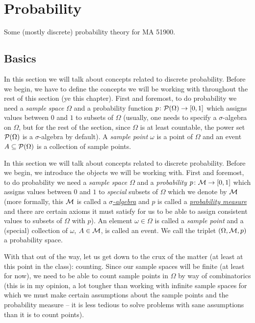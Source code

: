 \chapter{Probability}
Some (mostly discrete) probability theory for MA 51900.

\section{Basics}
In this section we will talk about concepts related to discrete
probability. Before we begin, we have to define the concepts we will be
working with throughout the rest of this section (ye this chapter). First
and foremost, to do probability we need a \emph{sample space \(\Omega\)}
and a probability function \(p\colon\mathcal{P}(\Omega)\to[0,1]\) which assigns
values between \(0\) and \(1\) to subsets of \(\Omega\) (usually, one needs
to specify a \(\sigma\)-algebra on \(\Omega\), but for the rest of the
section, since \(\Omega\) is at least countable, the power set
\(\mathcal{P}(\Omega)\) is a \(\sigma\)-algebra by default). A \emph{sample
  point} \(\omega\) is a point of \(\Omega\) and an event
\(A\subseteq\mathcal{P}(\Omega)\) is a collection of sample points.

In this section we will talk about concepts related to discrete
probability. Before we begin, we introduce the objects we will be working
with. First and foremost, to do probability we need a \emph{sample space
  \(\Omega\)} and a \emph{probability \(p\colon\mathcal{M}\to[0,1]\)} which
assigns values between \(0\) and \(1\) to \emph{special} subsets of
\(\Omega\) which we denote by \(\mathcal{M}\) (more formally, this \(\mathcal{M}\) is
called a
\href{https://en.wikipedia.org/wiki/Sigma-algebra}{\emph{\(\sigma\)-algebra}}
and \(p\) is called a
\href{https://en.wikipedia.org/wiki/Probability_measure}{\emph{probability
    measure}} and there are certain axioms it must satisfy for us to be
able to assign consistent values to subsets of \(\Omega\) with \(p\)). An
element \(\omega\in\Omega\) is called a \emph{sample point} and a (special)
collection of \(\omega\), \(A\in\mathcal{M}\), is called an event. We call the
triplet \((\Omega,\mathcal{M},p)\) a probability space.

With that out of the way, let us get down to the crux of the matter (at
least at this point in the class): counting. Since our sample spaces will
be finite (at least for now), we need to be able to count sample points in
\(\Omega\) by way of combinatorics (this is in my opinion, a lot tougher
than working with infinite sample spaces for which we must make certain
assumptions about the sample points and the probability measure -- it is
less tedious to solve problems with sane assumptions than it is to count
points).

